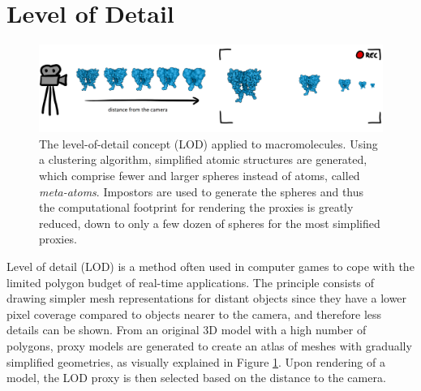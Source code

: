 %

\section{Level of Detail}

\begin{figure}
	\centering
	\includegraphics[width=0.99\linewidth]{graphics/lod}
	\caption{The level-of-detail concept (LOD) applied to macromolecules. Using a clustering algorithm, simplified atomic structures are generated, which comprise fewer and larger spheres instead of atoms, called \textit{meta-atoms}.
		Impostors are used to generate the spheres and thus the computational footprint for rendering the proxies is greatly reduced, down to only a few dozen of spheres for the most simplified proxies.}
	\label{fig:lod}
\end{figure}

Level of detail (LOD) is a method often used in computer games to cope with the limited polygon budget of real-time applications.
The principle consists of drawing simpler mesh representations for distant objects since they have a lower pixel coverage compared to objects nearer to the camera, and therefore less details can be shown.
From an original 3D model with a high number of polygons, proxy models are generated to create an atlas of meshes with gradually simplified geometries, as visually explained in Figure \ref{fig:lod}.
Upon rendering of a model, the LOD proxy is then selected based on the distance to the camera.


